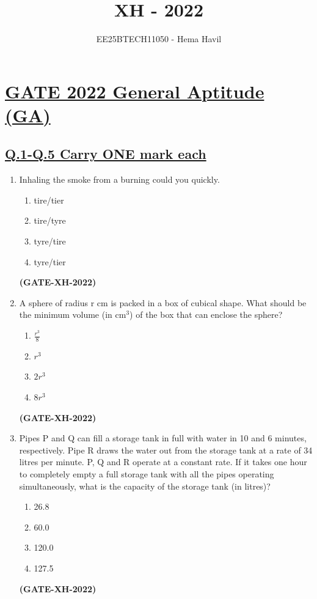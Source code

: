 \documentclass[journal]{IEEEtran}
\title{\textbf{XH - 2022}}
\author{EE25BTECH11050 - Hema Havil}
\begin{document}
\maketitle
\section*{\large \underline{\textbf {GATE 2022 General Aptitude (GA)}}}
\vspace{0.2cm}
\subsection*{\underline{\textbf{Q.1-Q.5 Carry ONE mark each}}}

\begin{enumerate}

\item Inhaling the smoke from a burning could you quickly.
\begin{multicols}{2}
\begin{enumerate}[label=(\Alph*)]
\item tire/tier
\item tire/tyre
\item tyre/tire
\item tyre/tier
\end{enumerate}
\end{multicols}
\hfill\textbf{(GATE-XH-2022)}

\item A sphere of radius r cm is packed in a box of cubical shape. What should be the minimum volume (in cm$^3$) of the box that can enclose the sphere?
\begin{multicols}{2}
\begin{enumerate}
\item $\frac{r^{3}}{8}$
\item $r^{3}$
\item $2r^{3}$
\item $8r^{3}$
\end{enumerate}
\end{multicols}
\hfill\textbf{(GATE-XH-2022)}

\item Pipes P and Q can fill a storage tank in full with water in 10 and 6 minutes, respectively. Pipe R draws the water out from the storage tank at a rate of 34 litres per minute. P, Q and R operate at a constant rate. If it takes one hour to completely empty a full storage tank with all the pipes operating simultaneously, what is the capacity of the storage tank (in litres)?
\begin{multicols}{2}
\begin{enumerate}
\item 26.8
\item 60.0
\item 120.0
\item 127.5
\end{enumerate}
\end{multicols}
\hfill\textbf{(GATE-XH-2022)}


\end{enumerate}
\end{document}
